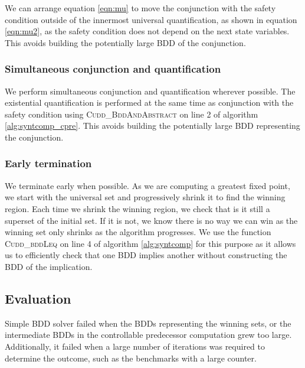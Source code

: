 We can arrange equation \ref{eqn:mu} to move the conjunction with the safety condition outside of the innermost universal quantification, as shown in equation \ref{eqn:mu2}, as the safety condition does not depend on the next state variables. This avoids building the potentially large BDD of the conjunction.

\subsubsection{Simultaneous conjunction and quantification}
We perform simultaneous conjunction and quantification wherever possible. The existential quantification is performed at the same time as conjunction with the safety condition using \textsc{Cudd\_BddAndAbstract} on line 2 of algorithm \ref{alg:syntcomp_cpre}. This avoids building the potentially large BDD representing the conjunction.

\subsubsection{Early termination}
We terminate early when possible. As we are computing a greatest fixed point, we start with the universal set and progressively shrink it to find the winning region. Each time we shrink the winning region, we check that is it still a superset of the initial set. If it is not, we know there is no way we can win as the winning set only shrinks as the algorithm progresses. We use the function \textsc{Cudd\_bddLeq} on line 4 of algorithm \ref{alg:syntcomp} for this purpose as it allows us to efficiently check that one BDD implies another without constructing the BDD of the implication.

\subsection{Evaluation}
Simple BDD solver failed when the BDDs representing the winning sets, or the intermediate BDDs in the controllable predecessor computation grew too large. Additionally, it failed when a large number of iterations was required to determine the outcome, such as the benchmarks with a large counter.

